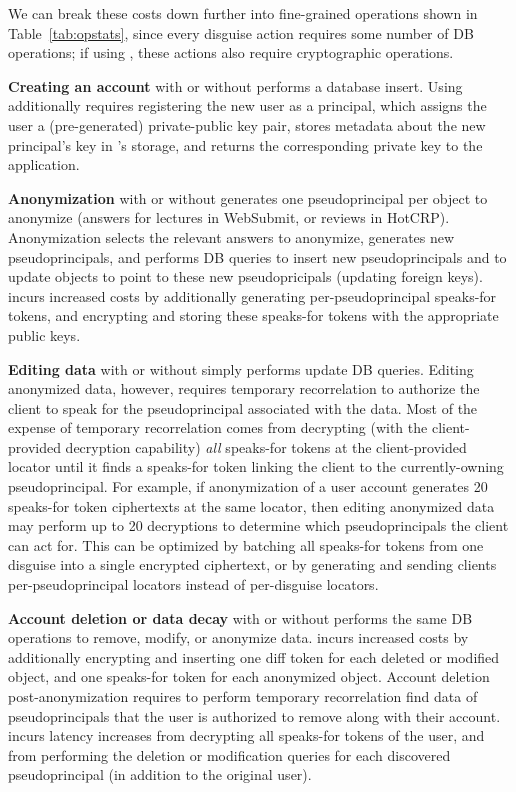 We can break these costs down further into fine-grained operations shown in 
Table~\ref{tab:opstats}, since every disguise action requires some number of DB operations; if using
\sys, these actions also require cryptographic operations.

\textbf{Creating an account} with or without \sys performs a database insert. Using \sys additionally
requires registering the new user as a principal, which assigns the user a (pre-generated)
private-public key pair, stores metadata about the new principal's key in \sys's storage, and
returns the corresponding private key to the application.

\textbf{Anonymization} with or without \sys generates one pseudoprincipal per object to anonymize
(\eg answers for lectures in WebSubmit, or reviews in HotCRP). Anonymization selects the relevant answers
to anonymize, generates new pseudoprincipals, and performs DB queries to insert new pseudoprincipals
and to update objects to point to these new pseudopricipals (\eg updating foreign keys).
\sys incurs increased costs by additionally generating per-pseudoprincipal speaks-for tokens, and 
encrypting and storing these speaks-for tokens with the appropriate public keys.

\textbf{Editing data} with or without \sys simply performs update DB queries. Editing anonymized data,
however, requires temporary recorrelation to authorize the client to speak for the pseudoprincipal
associated with the data.  Most of the expense of temporary recorrelation comes from \sys decrypting
(with the client-provided decryption capability) \emph{all} speaks-for tokens at the client-provided
locator until it finds a speaks-for token linking the client to the currently-owning pseudoprincipal.
For example, if anonymization of a user account generates 20 speaks-for token ciphertexts at the same
locator, then editing anonymized data may perform up to 20 decryptions to
determine which pseudoprincipals the client can act for. This can be optimized by batching all
speaks-for tokens from one disguise into a single encrypted ciphertext, or by generating and sending
clients per-pseudoprincipal locators instead of per-disguise locators.

\textbf{Account deletion or data decay} with or without \sys performs the same DB operations to
remove, modify, or anonymize data.  \sys incurs increased costs by additionally encrypting and
inserting one diff token for each deleted or modified object, and one speaks-for token for each
anonymized object.  Account deletion post-anonymization requires \sys to perform temporary
recorrelation find data of pseudoprincipals that the user is authorized to remove along with their
account.  \sys incurs latency increases from decrypting all speaks-for tokens of the user, and from
performing the deletion or modification queries for each discovered pseudoprincipal (in addition to
the original user).

